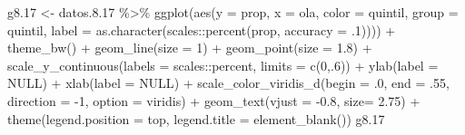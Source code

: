 \documentclass[
  12pt,
]{book}
\newenvironment{Shaded}{\begin{snugshade}}{\end{snugshade}}
\newcommand{\AttributeTok}[1]{\textcolor[rgb]{0.77,0.63,0.00}{#1}}
\newcommand{\ConstantTok}[1]{\textcolor[rgb]{0.00,0.00,0.00}{#1}}
\newcommand{\DecValTok}[1]{\textcolor[rgb]{0.00,0.00,0.81}{#1}}
\newcommand{\FloatTok}[1]{\textcolor[rgb]{0.00,0.00,0.81}{#1}}
\newcommand{\FunctionTok}[1]{\textcolor[rgb]{0.00,0.00,0.00}{#1}}
\newcommand{\NormalTok}[1]{#1}
\newcommand{\OtherTok}[1]{\textcolor[rgb]{0.56,0.35,0.01}{#1}}
\newcommand{\SpecialCharTok}[1]{\textcolor[rgb]{0.00,0.00,0.00}{#1}}
\newcommand{\StringTok}[1]{\textcolor[rgb]{0.31,0.60,0.02}{#1}}
\begin{document}
\begin{Shaded}
\begin{Highlighting}[]
\NormalTok{g8}\FloatTok{.17} \OtherTok{\textless{}{-}}\NormalTok{ datos.}\FloatTok{8.17} \SpecialCharTok{\%\textgreater{}\%} 
  \FunctionTok{ggplot}\NormalTok{(}\FunctionTok{aes}\NormalTok{(}\AttributeTok{y =}\NormalTok{ prop, }\AttributeTok{x =}\NormalTok{ ola, }\AttributeTok{color =}\NormalTok{ quintil, }\AttributeTok{group =}\NormalTok{ quintil,}
             \AttributeTok{label =} \FunctionTok{as.character}\NormalTok{(scales}\SpecialCharTok{::}\FunctionTok{percent}\NormalTok{(prop, }\AttributeTok{accuracy =}\NormalTok{ .}\DecValTok{1}\NormalTok{)))) }\SpecialCharTok{+}
  \FunctionTok{theme\_bw}\NormalTok{() }\SpecialCharTok{+}   
  \FunctionTok{geom\_line}\NormalTok{(}\AttributeTok{size =} \DecValTok{1}\NormalTok{) }\SpecialCharTok{+}
  \FunctionTok{geom\_point}\NormalTok{(}\AttributeTok{size =} \FloatTok{1.8}\NormalTok{) }\SpecialCharTok{+}
  \FunctionTok{scale\_y\_continuous}\NormalTok{(}\AttributeTok{labels =}\NormalTok{ scales}\SpecialCharTok{::}\NormalTok{percent,}
                     \AttributeTok{limits =} \FunctionTok{c}\NormalTok{(}\DecValTok{0}\NormalTok{,.}\DecValTok{6}\NormalTok{)) }\SpecialCharTok{+}
  \FunctionTok{ylab}\NormalTok{(}\AttributeTok{label =} \ConstantTok{NULL}\NormalTok{) }\SpecialCharTok{+}
  \FunctionTok{xlab}\NormalTok{(}\AttributeTok{label =} \ConstantTok{NULL}\NormalTok{) }\SpecialCharTok{+}
  \FunctionTok{scale\_color\_viridis\_d}\NormalTok{(}\AttributeTok{begin =}\NormalTok{ .}\DecValTok{0}\NormalTok{, }\AttributeTok{end =}\NormalTok{ .}\DecValTok{55}\NormalTok{, }\AttributeTok{direction =} \SpecialCharTok{{-}}\DecValTok{1}\NormalTok{, }\AttributeTok{option =} \StringTok{\textquotesingle{}viridis\textquotesingle{}}\NormalTok{) }\SpecialCharTok{+}
  \FunctionTok{geom\_text}\NormalTok{(}\AttributeTok{vjust =} \SpecialCharTok{{-}}\FloatTok{0.8}\NormalTok{,}
            \AttributeTok{size=} \FloatTok{2.75}\NormalTok{) }\SpecialCharTok{+}
  \FunctionTok{theme}\NormalTok{(}\AttributeTok{legend.position =} \StringTok{\textquotesingle{}top\textquotesingle{}}\NormalTok{,}
        \AttributeTok{legend.title =} \FunctionTok{element\_blank}\NormalTok{())}
\NormalTok{g8}\FloatTok{.17}
\end{Highlighting}
\end{Shaded}
\end{document}
